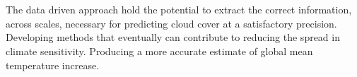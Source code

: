 \\ \\
The data driven approach hold the potential to extract the correct information, across scales, necessary for predicting cloud cover at a satisfactory precision. Developing methods that eventually can contribute to reducing the spread in climate sensitivity. Producing a more accurate estimate of global mean temperature increase.

